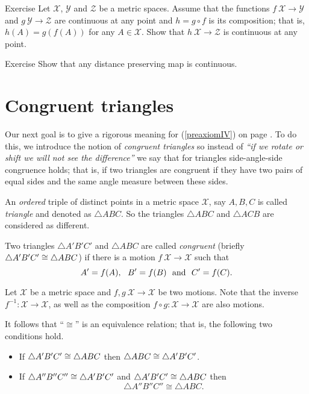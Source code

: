 \begin{thm}{Exercise}\label{ex:comp+cont}
Let $\mathcal{X}$, $\mathcal{Y}$ and $\mathcal{Z}$ be a metric spaces.
Assume that the functions $f\:\mathcal{X}\to\mathcal{Y}$
and $g\:\mathcal{Y}\to\mathcal{Z}$ are continuous at any point
and $h=g\circ f$ is its composition;
that is, $h(A)=g(f(A))$ for any $A\in \mathcal{X}$.
Show that $h\:\mathcal{X}\to\mathcal{Z}$ is continuous at any point.
\end{thm}

\begin{thm}{Exercise}\label{ex:isom-cont}
Show that any distance preserving map is continuous.
\end{thm}




\section*{Congruent triangles} 

Our next goal is to give a rigorous meaning for  (\ref{preaxiomIV}) on page \pageref{preaxiomIV}.
To do this, we introduce the notion of {}\emph{congruent triangles}
so instead of {}\emph{``if we rotate or shift we will not see the difference''} we say that for triangles side-angle-side congruence holds;
that is, if two triangles are congruent if they have two pairs of equal sides and the same angle measure between these sides.

An {}\emph{ordered} triple of distinct points in a metric space $\mathcal{X}$, 
say $A,B,C$
is called \emph{triangle} and denoted as $\triangle A B C$.
So the triangles $\triangle A B C$ and $\triangle A C B$ are considered as different.

Two triangles $\triangle A' B' C'$ and $\triangle A B C$ are called \emph{congruent}
(briefly \index{$\cong$}$\triangle A' B' C'\z\cong\triangle A B C$) if there is a motion $f\:\mathcal{X}\to\mathcal{X}$ such that 
\[A'\z=f(A),\ \  B'=f(B)\ \ \text{and}\ \ C'=f(C).\]

Let $\mathcal X$ be a metric space
and $f,g\:\mathcal X\to\mathcal X$ be two motions.
Note that the inverse $f^{-1}:\mathcal X\to\mathcal X$,
as well as the composition $f\circ g:\mathcal X\to\mathcal X$
are also motions.

It follows that ``$\cong$'' is an equivalence relation;
that is, the following two conditions hold.
\begin{itemize} 
\item If $\triangle A' B' C'\z\cong\triangle A B C$ then $\triangle A B C\z\cong\triangle A' B' C'$.
\item If $\triangle A'' B'' C''\z\cong\triangle A' B' C'$ and $\triangle A' B' C'\z\cong\triangle A B C$ 
then 
$$\triangle A'' B'' C''\cong\triangle A B C.$$
\end{itemize}



